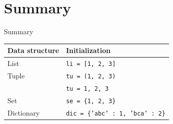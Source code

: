 \documentclass[10pt,compress]{beamer} %
\begin{document}
\section{Summary}
\begin{frame}{Summary}
	
\centering \begin{tabular}{l|l}
\hline
\sc Data structure & \sc Initialization  \\\hline
List   & \texttt{li = [1, 2, 3]} \\
Tuple  & \texttt{tu = (1, 2, 3)} \\
	   & \texttt{tu = 1, 2, 3} \\
Set    & \texttt{se = \{1, 2, 3\}} \\
Dictionary& \texttt{dic = \{'abc' : 1, 'bca' : 2\}} \\\hline
\end{tabular}
\end{frame}
\end{document}

